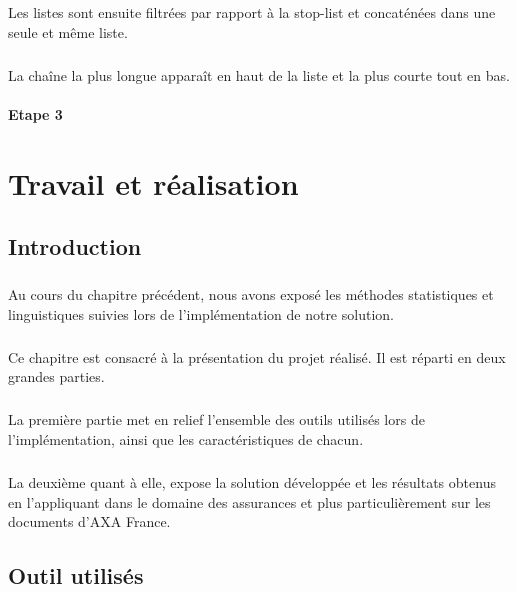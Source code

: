 \documentclass[12pt, a4paper, oneside]{book}
\begin{document}
\paragraph{}
Les listes sont ensuite filtrées par rapport à la stop-list et concaténées dans une seule et même liste.
\paragraph{}
La chaîne la plus longue apparaît en haut de la liste et la plus courte tout en bas.

\subsubsection{Etape 3}



\chapter{Travail et réalisation}

\section{Introduction}
\paragraph{}
Au cours du chapitre précédent, nous avons exposé les méthodes statistiques et linguistiques suivies lors de l'implémentation de notre solution.
\paragraph{}
Ce chapitre est consacré à la présentation du projet réalisé. Il est réparti en deux grandes parties.
\paragraph{}
La première partie met en relief l'ensemble des outils utilisés lors de l'implémentation, ainsi que les caractéristiques de chacun.
\paragraph{}
La deuxième quant à elle, expose la solution développée et les résultats obtenus en l'appliquant dans le domaine des assurances et plus particulièrement sur les documents d'AXA France.

\section{Outil utilisés}
\end{document}
